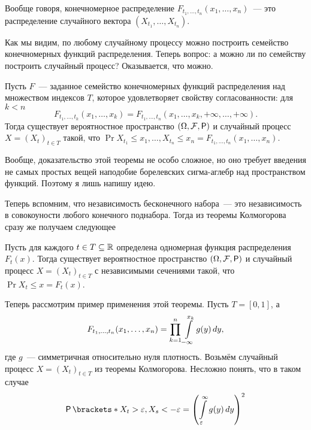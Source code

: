 Вообще говоря, конечномерное распределение \(F_{t_{1}, \dots, t_{n}}(x_{1}, 
\dots, x_{n})\)~--- это распределение случайного вектора \((X_{t_{1}}, \dots, 
X_{t_{n}})\).

Как мы видим, по любому случайному процессу можно построить семейство 
конечномерных функций распределения. Теперь вопрос: а можно ли по семейству 
построить случайный процесс? Оказывается, что можно.
\begin{theorem}
	Пусть \(F\)~--- заданное семейство конечномерных функций распределения над 
	множеством индексов \(T\), которое удовлетворяет свойству согласованности: 
	для \(k < n\)
	\[
	F_{t_{1}, \dots, t_{k}}(x_{1}, \dots, x_{k}) = F_{t_{1}, \dots, 
		t_{n}}(x_{1}, \dots, x_{k}, +\infty, \dots, +\infty).
	\]
	Тогда существует вероятностное пространство \((\Omega, \F, \Pr)\) и 
	случайный процесс \(X = (X_{t})_{t \in T}\) такой, что \(\Pr{X_{t_{1}} \leq 
	x_{1}, \ldots, X_{t_{n}} \leq x_{n}} = F_{t_{1}, \dots, t_{n}}(x_{1}, 
	\dots, x_{n})\).
\end{theorem}
\begin{leftbar}
	\begin{small}\noindent
		Вообще, доказательство этой теоремы не особо сложное, но оно требует 
		введения не самых простых вещей наподобие борелевских сигма-аглебр над 
		пространством функций. Поэтому я лишь напишу идею.
	\end{small}
\end{leftbar}

Теперь вспомним, что независимость бесконечного набора~--- это независимость в 
совокоуности любого конечного поднабора. Тогда из теоремы Колмогорова сразу же 
получаем следующее
\begin{consequence}
	Пусть для каждого \(t \in T \subseteq \mathbb{R}\) определена одномерная функция 
	распределения \(F_{t}(x)\). Тогда существует вероятностное пространство 
	\((\Omega, \F, \Pr)\) и случайный процесс \(X = (X_{t})_{t \in T}\) с 
	независимыми сечениями такой, что \(\Pr{X_{t} \leq x} = F_{t}(x)\).
\end{consequence}

Теперь рассмотрим пример применения этой теоремы. Пусть \(T = [0, 1]\), а 
\[
F_{t_{1}, \ldots, t_{n}}(x_{1}, \ldots, x_{n}) = \prod_{k = 1}^{n} 
\int\limits_{-\infty}^{x_{k}} g(y)\mathop{}\!d y,
\]
где \(g\)~--- симметричная относительно нуля плотность. Возьмём случайный 
процесс \(X = (X_{t})_{t \in T}\) из теоремы Колмогорова. Несложно понять, что 
в таком случае
\[
\Pr{X_{t} > \epsilon, X_{s} < - \epsilon} = 
\left(\int\limits_{\epsilon}^{\infty}g(y)\diff y\right)^{2}
\]

